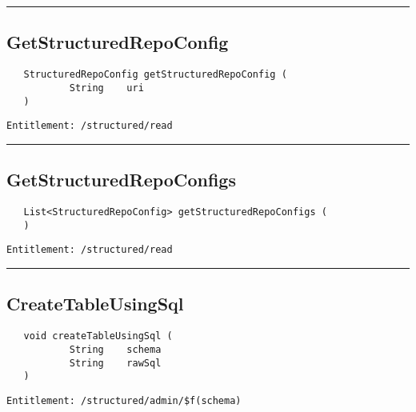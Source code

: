 \rule{12cm}{2pt}
\subsection{GetStructuredRepoConfig}
\label{Api:GetStructuredRepoConfig}
\begin{verbatim}
   StructuredRepoConfig getStructuredRepoConfig (
           String    uri
   )
\end{verbatim}
\begin{Verbatim}[fontsize=\small, formatcom=\color{Maroon}]
  Entitlement: /structured/read
\end{Verbatim}



\rule{12cm}{2pt}
\subsection{GetStructuredRepoConfigs}
\label{Api:GetStructuredRepoConfigs}
\begin{verbatim}
   List<StructuredRepoConfig> getStructuredRepoConfigs (
   )
\end{verbatim}
\begin{Verbatim}[fontsize=\small, formatcom=\color{Maroon}]
  Entitlement: /structured/read
\end{Verbatim}



\rule{12cm}{2pt}
\subsection{CreateTableUsingSql}
\label{Api:CreateTableUsingSql}
\begin{verbatim}
   void createTableUsingSql (
           String    schema
           String    rawSql
   )
\end{verbatim}
\begin{Verbatim}[fontsize=\small, formatcom=\color{Maroon}]
  Entitlement: /structured/admin/$f(schema)
\end{Verbatim}



